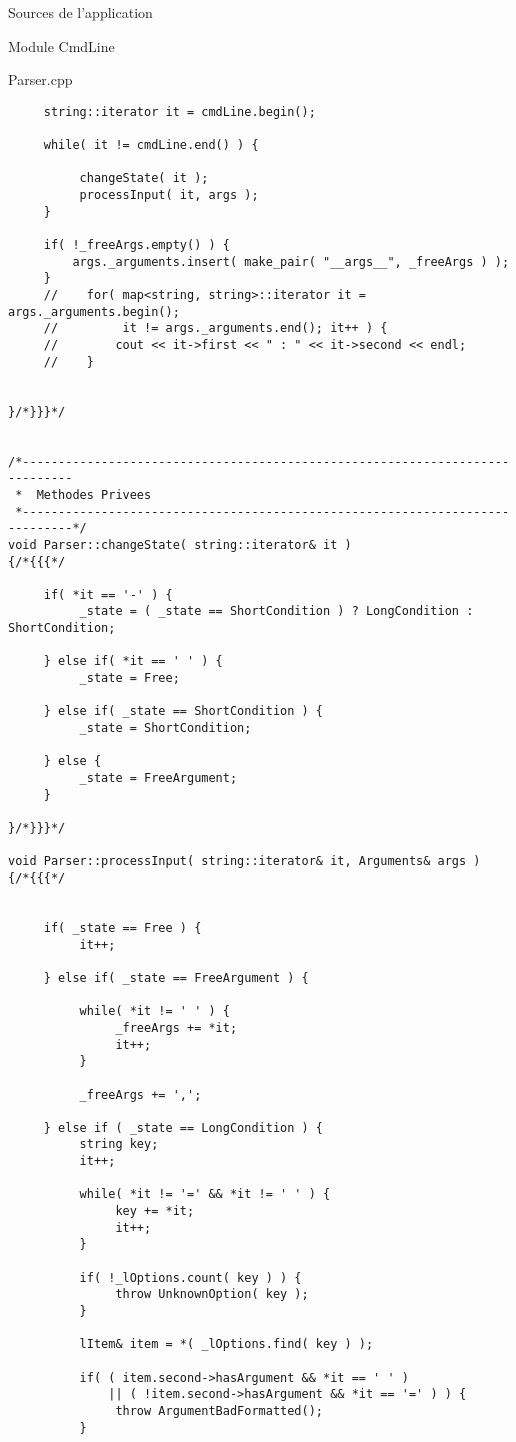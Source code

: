\documentclass{article}
\begin{document}
\begin{section}{Sources de l'application}
\begin{subsection}{Module CmdLine}
\begin{paragraph}{Parser.cpp}
\begin{verbatim}
     string::iterator it = cmdLine.begin();

     while( it != cmdLine.end() ) {

          changeState( it );
          processInput( it, args );
     }

     if( !_freeArgs.empty() ) {
         args._arguments.insert( make_pair( "__args__", _freeArgs ) );
     }
     //    for( map<string, string>::iterator it = args._arguments.begin();
     //         it != args._arguments.end(); it++ ) {
     //        cout << it->first << " : " << it->second << endl;
     //    }


}/*}}}*/


/*-----------------------------------------------------------------------------
 *  Methodes Privees
 *-----------------------------------------------------------------------------*/
void Parser::changeState( string::iterator& it )
{/*{{{*/

     if( *it == '-' ) {
          _state = ( _state == ShortCondition ) ? LongCondition : ShortCondition;

     } else if( *it == ' ' ) {
          _state = Free;

     } else if( _state == ShortCondition ) {
          _state = ShortCondition;

     } else {
          _state = FreeArgument;
     }

}/*}}}*/

void Parser::processInput( string::iterator& it, Arguments& args )
{/*{{{*/


     if( _state == Free ) {
          it++;

     } else if( _state == FreeArgument ) {

          while( *it != ' ' ) {
               _freeArgs += *it;
               it++;
          }

          _freeArgs += ',';

     } else if ( _state == LongCondition ) {
          string key;
          it++;

          while( *it != '=' && *it != ' ' ) {
               key += *it;
               it++;
          }

          if( !_lOptions.count( key ) ) {
               throw UnknownOption( key );
          }

          lItem& item = *( _lOptions.find( key ) );

          if( ( item.second->hasArgument && *it == ' ' )
              || ( !item.second->hasArgument && *it == '=' ) ) {
               throw ArgumentBadFormatted();
          }


\end{verbatim}
\end{paragraph}
\end{subsection}
\end{section}
\end{document}
